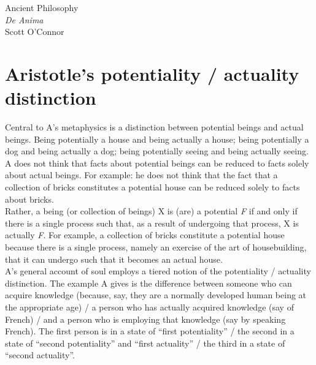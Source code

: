 \documentclass[11pt]{article}
\begin{document}
\thispagestyle{empty}
\begin{center} \LARGE{Ancient Philosophy\\ \emph{De Anima}}\\ \vspace*{2mm}
\large{Scott O'Connor}\end{center}
\thispagestyle{empty}\vspace*{3mm}
\vspace*{-8mm}

\section*{Aristotle's potentiality / actuality distinction}

\noindent Central to A's metaphysics is a distinction between potential beings and actual beings. Being potentially a house and being actually a house; being potentially a dog and being actually a dog; being potentially seeing and being actually seeing.\\

\noindent A does not think that facts about potential beings can be reduced to facts solely about actual beings. For example: he does not think that the fact that a collection of bricks constitutes a potential house can be reduced solely to facts about bricks.\\

\noindent Rather, a being (or collection of beings) X is (are) a potential \emph{F} if and only if there is a single process such that, as a result of undergoing that process, X is actually \emph{F}. For example, a collection of bricks constitute a potential house because there is a single process, namely an exercise of the art of housebuilding, that it can undergo such that it becomes an actual house.\\

\noindent A's general account of soul employs a tiered notion of the potentiality / actuality distinction. The example A gives is the difference between someone who can acquire knowledge (because, say, they are a normally developed human being at the appropriate age) / a person who has actually acquired knowledge (say of French) / and a person who is employing that knowledge (say by speaking French). The first person is in a state of ``first potentiality'' / the second in a state of ``second potentiality'' and ``first actuality'' / the third in a state of ``second actuality''.
\end{document}
